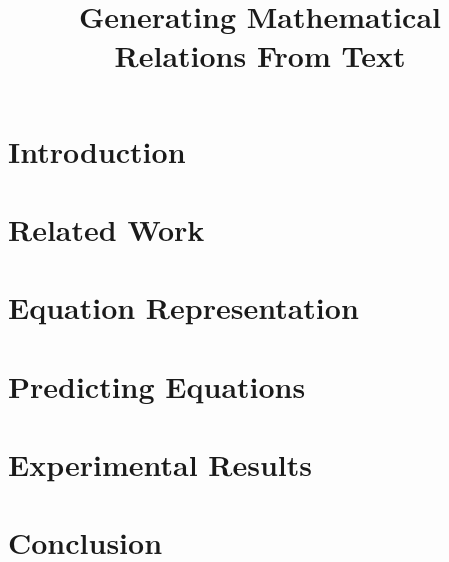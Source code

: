 
\title{Generating Mathematical Relations From Text}


\date{}


\maketitle
\begin{abstract}

\end{abstract}

\section{Introduction}


\section{Related Work}


\section{Equation Representation}


\section{Predicting Equations}


\section{Experimental Results}


\section{Conclusion}



